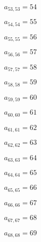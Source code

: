 \documentclass[a4paper,12pt]{article}
\begin{document}
$a _{ 53, 53 } = 54$

$a _{ 54, 54 } = 55$

$a _{ 55, 55 } = 56$

$a _{ 56, 56 } = 57$

$a _{ 57, 57 } = 58$

$a _{ 58, 58 } = 59$

$a _{ 59, 59 } = 60$

$a _{ 60, 60 } = 61$

$a _{ 61, 61 } = 62$

$a _{ 62, 62 } = 63$

$a _{ 63, 63 } = 64$

$a _{ 64, 64 } = 65$

$a _{ 65, 65 } = 66$

$a _{ 66, 66 } = 67$

$a _{ 67, 67 } = 68$

$a _{ 68, 68 } = 69$
\end{document}
